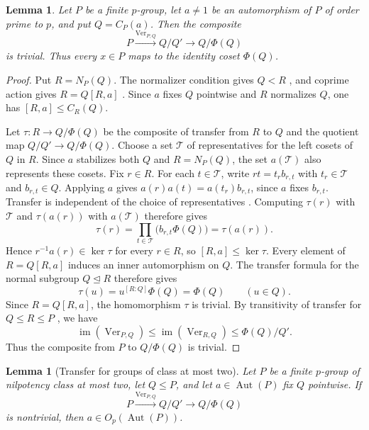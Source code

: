\documentclass[11pt,a4paper]{article}
\newtheorem{lemma}[theorem]{Lemma}
\theoremstyle{definition}
\theoremstyle{remark}
\numberwithin{equation}{section}
\DeclareMathOperator{\Aut}{Aut}
\begin{document}
	\begin{lemma}\label{lem:coprime-transfer}
		Let $P$ be a finite $p$-group, let $a\ne1$ be an automorphism of $P$
		of order prime to $p$, and put $Q=C_P(a)$. Then the composite
		\[
		P\xrightarrow{\operatorname{Ver}_{P,Q}}Q/Q'
		\longrightarrow Q/\Phi(Q)
		\]
		is trivial. Thus every $x\in P$ maps to the identity coset $\Phi(Q)$.
	\end{lemma}
	
	\begin{proof}
		Put $R=N_P(Q)$.
		The normalizer condition gives $Q<R$
		\cite[Theorem~1.22]{Isaacs2008}, and coprime action gives
		$R=Q[R,a]$ \cite[Lemma~4.28]{Isaacs2008}.
		Since $a$ fixes $Q$ pointwise and $R$ normalizes $Q$, one has
		$[R,a]\le C_R(Q)$.
		
		Let $\tau:R\to Q/\Phi(Q)$ be the composite of transfer from $R$ to $Q$
		and the quotient map $Q/Q'\to Q/\Phi(Q)$. Choose a set $\mathcal T$
		of representatives for the left cosets of $Q$ in $R$. Since $a$ stabilizes
		both $Q$ and $R=N_P(Q)$, the set $a(\mathcal T)$ also represents these cosets.
		Fix $r\in R$. For each $t\in\mathcal T$, write $rt=t_r b_{r,t}$ with
		$t_r\in\mathcal T$ and $b_{r,t}\in Q$. Applying $a$ gives
		$a(r)a(t)=a(t_r)b_{r,t}$, since $a$ fixes $b_{r,t}$.
		Transfer is independent of the choice of representatives
		\cite[Theorem~5.1]{Isaacs2008}. Computing $\tau(r)$ with $\mathcal T$
		and $\tau(a(r))$ with $a(\mathcal T)$ therefore gives
		\[
		\tau(r)=\prod_{t\in\mathcal T}\bigl(b_{r,t}\Phi(Q)\bigr)=\tau(a(r)).
		\]
		Hence $r^{-1}a(r)\in\ker\tau$ for every $r\in R$, so $[R,a]\le\ker\tau$.
		Every element of $R=Q[R,a]$ induces an inner automorphism on $Q$.
		The transfer formula for the normal subgroup $Q\unlhd R$ therefore
		gives
		\[
		\tau(u)=u^{[R:Q]}\Phi(Q)=\Phi(Q)\qquad(u\in Q).
		\]
		Since $R=Q[R,a]$, the homomorphism $\tau$ is trivial. By transitivity of
		transfer for $Q\le R\le P$ \cite[Theorem~10.8]{Isaacs2008}, we have
		\[
		\operatorname{im}(\operatorname{Ver}_{P,Q})
		\le \operatorname{im}(\operatorname{Ver}_{R,Q})
		\le \Phi(Q)/Q'.
		\]
		Thus the composite from $P$ to $Q/\Phi(Q)$ is trivial.
	\end{proof}
	
	\begin{lemma}[Transfer for groups of class at most two]
		\label{lem:class-two-transfer}
		Let $P$ be a finite $p$-group of nilpotency class at most two,
		let $Q\le P$, and let $a\in\Aut(P)$ fix $Q$ pointwise.
		If
		\[
		P\xrightarrow{\operatorname{Ver}_{P,Q}}Q/Q'\longrightarrow Q/\Phi(Q)
		\]
		is nontrivial, then $a\in O_p(\Aut(P))$.
	\end{lemma}
	
\end{document}
